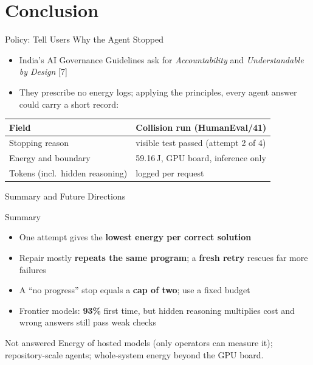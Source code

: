 \documentclass[aspectratio=169,11pt,t]{beamer}
\newcommand{\src}[1]{{\tiny\color{footgrey}#1}}
\begin{document}
\section{Conclusion}

\begin{frame}{Policy: Tell Users Why the Agent Stopped}
\begin{itemize}
\item India's AI Governance Guidelines ask for \emph{Accountability} and \emph{Understandable by Design} \src{[7]}
\item They prescribe no energy logs; applying the principles, every agent answer could carry a short record:
\end{itemize}
\vspace{0.6em}
\centering
\begin{tabular}{@{}ll@{}}
\toprule
Field & Collision run (HumanEval/41)\\
\midrule
Stopping reason & visible test passed (attempt 2 of 4)\\
Energy and boundary & 59.16\,J, GPU board, inference only\\
Tokens (incl.\ hidden reasoning) & logged per request\\
\bottomrule
\end{tabular}
\end{frame}

\begin{frame}{Summary and Future Directions}
\begin{keybox}{Summary}
\begin{itemize}\small
\item One attempt gives the \textbf{lowest energy per correct solution}
\item Repair mostly \textbf{repeats the same program}; a \textbf{fresh retry} rescues far more failures
\item A ``no progress'' stop equals a \textbf{cap of two}; use a fixed budget
\item Frontier models: \textbf{93\%} first time, but hidden reasoning multiplies cost and wrong answers still pass weak checks
\end{itemize}
\end{keybox}
\begin{defbox}{Not answered}
\small Energy of hosted models (only operators can measure it); repository-scale agents; whole-system energy beyond the GPU board.
\end{defbox}
\end{frame}
\end{document}
